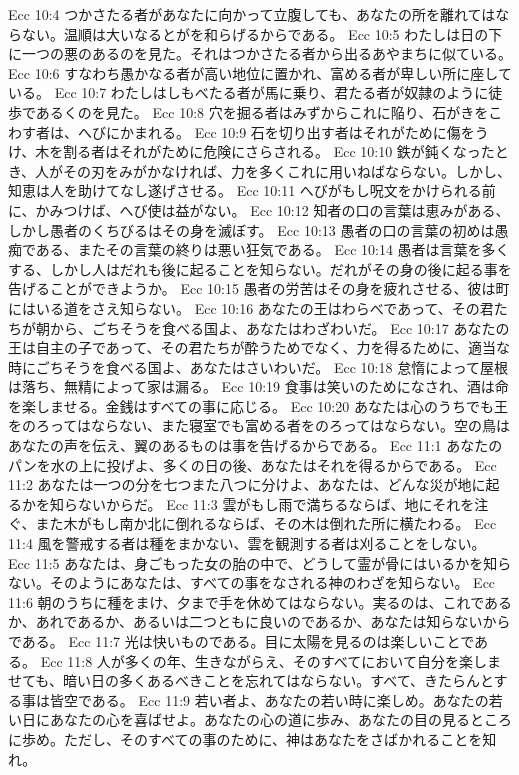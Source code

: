 Ecc 10:4  つかさたる者があなたに向かって立腹しても、あなたの所を離れてはならない。温順は大いなるとがを和らげるからである。
Ecc 10:5  わたしは日の下に一つの悪のあるのを見た。それはつかさたる者から出るあやまちに似ている。
Ecc 10:6  すなわち愚かなる者が高い地位に置かれ、富める者が卑しい所に座している。
Ecc 10:7  わたしはしもべたる者が馬に乗り、君たる者が奴隷のように徒歩であるくのを見た。
Ecc 10:8  穴を掘る者はみずからこれに陥り、石がきをこわす者は、へびにかまれる。
Ecc 10:9  石を切り出す者はそれがために傷をうけ、木を割る者はそれがために危険にさらされる。
Ecc 10:10  鉄が鈍くなったとき、人がその刃をみがかなければ、力を多くこれに用いねばならない。しかし、知恵は人を助けてなし遂げさせる。
Ecc 10:11  へびがもし呪文をかけられる前に、かみつけば、へび使は益がない。
Ecc 10:12  知者の口の言葉は恵みがある、しかし愚者のくちびるはその身を滅ぼす。
Ecc 10:13  愚者の口の言葉の初めは愚痴である、またその言葉の終りは悪い狂気である。
Ecc 10:14  愚者は言葉を多くする、しかし人はだれも後に起ることを知らない。だれがその身の後に起る事を告げることができようか。
Ecc 10:15  愚者の労苦はその身を疲れさせる、彼は町にはいる道をさえ知らない。
Ecc 10:16  あなたの王はわらべであって、その君たちが朝から、ごちそうを食べる国よ、あなたはわざわいだ。
Ecc 10:17  あなたの王は自主の子であって、その君たちが酔うためでなく、力を得るために、適当な時にごちそうを食べる国よ、あなたはさいわいだ。
Ecc 10:18  怠惰によって屋根は落ち、無精によって家は漏る。
Ecc 10:19  食事は笑いのためになされ、酒は命を楽しませる。金銭はすべての事に応じる。
Ecc 10:20  あなたは心のうちでも王をのろってはならない、また寝室でも富める者をのろってはならない。空の鳥はあなたの声を伝え、翼のあるものは事を告げるからである。
Ecc 11:1  あなたのパンを水の上に投げよ、多くの日の後、あなたはそれを得るからである。
Ecc 11:2  あなたは一つの分を七つまた八つに分けよ、あなたは、どんな災が地に起るかを知らないからだ。
Ecc 11:3  雲がもし雨で満ちるならば、地にそれを注ぐ、また木がもし南か北に倒れるならば、その木は倒れた所に横たわる。
Ecc 11:4  風を警戒する者は種をまかない、雲を観測する者は刈ることをしない。
Ecc 11:5  あなたは、身ごもった女の胎の中で、どうして霊が骨にはいるかを知らない。そのようにあなたは、すべての事をなされる神のわざを知らない。
Ecc 11:6  朝のうちに種をまけ、夕まで手を休めてはならない。実るのは、これであるか、あれであるか、あるいは二つともに良いのであるか、あなたは知らないからである。
Ecc 11:7  光は快いものである。目に太陽を見るのは楽しいことである。
Ecc 11:8  人が多くの年、生きながらえ、そのすべてにおいて自分を楽しませても、暗い日の多くあるべきことを忘れてはならない。すべて、きたらんとする事は皆空である。
Ecc 11:9  若い者よ、あなたの若い時に楽しめ。あなたの若い日にあなたの心を喜ばせよ。あなたの心の道に歩み、あなたの目の見るところに歩め。ただし、そのすべての事のために、神はあなたをさばかれることを知れ。
